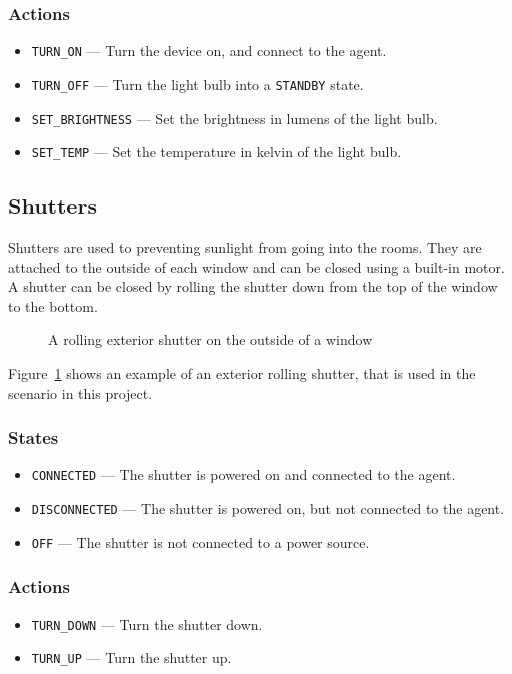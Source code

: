 \documentclass[letterpaper, 11pt]{Proposal}
\def\Fig#1{Figure~\ref{#1}}
\begin{document}
\subsubsection{Actions}
\begin{itemize}
    \item \texttt{TURN\_ON} --- Turn the device on, and connect to the agent.
    \item \texttt{TURN\_OFF} --- Turn the light bulb into a \texttt{STANDBY} state.
    \item \texttt{SET\_BRIGHTNESS} --- Set the brightness in lumens of the light bulb.
    \item \texttt{SET\_TEMP} --- Set the temperature in kelvin of the light bulb.
\end{itemize}

\subsection{Shutters}\label{subsec:03_devices_shutters}
Shutters are used to preventing sunlight from going into the rooms.
They are attached to the outside of each window and can be closed using a 
built-in motor.
A shutter can be closed by rolling the shutter down from the top of the 
window to the bottom.

\begin{figure}
    \centering
    \caption{A rolling exterior shutter on the outside of a window}
    \label{fig:03_devices_shutters_ref}
\end{figure}
\Fig{fig:03_devices_shutters_ref} shows an example of an exterior rolling shutter, 
that is used in the scenario in this project.

\subsubsection{States}
\begin{itemize}
    \item \texttt{CONNECTED} --- The shutter is powered on and connected to the agent.
    \item \texttt{DISCONNECTED} --- The shutter is powered on, but not connected to the agent.
    \item \texttt{OFF} --- The shutter is not connected to a power source.
\end{itemize}

\subsubsection{Actions}
\begin{itemize}
    \item \texttt{TURN\_DOWN} --- Turn the shutter down.
    \item \texttt{TURN\_UP} --- Turn the shutter up.
\end{itemize}
\end{document}
